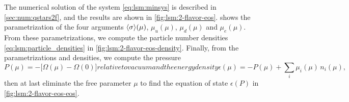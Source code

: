 The numerical solution of the system \eqref{eq:lsm:minsys} is described in \cref{sec:num:qstars2f}, and the results are shown in \cref{fig:lsm:2-flavor-eos}.
 shows the parametrization of the four arguments $\langle \sigma \rangle(\mu)$, $\mu_u(\mu)$, $\mu_d(\mu)$ and $\mu_e(\mu)$.
From these parametrizations, we compute the particle number densities \eqref{eq:lsm:particle_densities} in \cref{fig:lsm:2-flavor-eos-density}.
Finally, from the parametrizations and densities, we compute the pressure
\begin{subequations}
\begin{equation}
	P(\mu) = -\Big[\Omega(\mu) - \Omega(0)\Big]
\label{eq:lsm:pressure_bagless}
\end{equation}
relative to vacuum and the energy density
\begin{equation}
	\epsilon(\mu) = -P(\mu) + \sum_i \mu_i(\mu) \, n_i(\mu) ,
\label{eq:lsm:energy_density_bagless}
\end{equation}%
\label{eq:lsm:eos}%
\end{subequations}%
then at last eliminate the free parameter $\mu$ to find the equation of state $\epsilon(P)$ in \cref{fig:lsm:2-flavor-eos-eos}.

